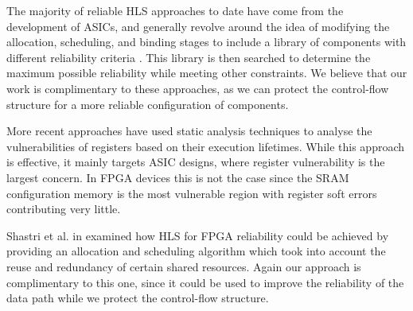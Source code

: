 The majority of reliable HLS approaches to date have come from the development
of ASICs, and generally revolve around the idea of modifying the
allocation, scheduling, and binding stages to include a library of
components with different reliability criteria \cite{tosun2005reliability}\cite{glass2007interactive}\cite{hara2013cost}.
This library is then searched to determine the maximum possible reliability while
meeting other constraints. We believe that our work is complimentary to these approaches,
as we can protect the control-flow structure for a more reliable configuration of components.

More recent approaches have used static analysis techniques to analyse the
vulnerabilities of registers based on their execution lifetimes\cite{chen2014reliability}.
While this approach is effective, it mainly targets ASIC designs, where register
vulnerability is the largest concern. In FPGA devices this is not the case since the
SRAM configuration memory is the most vulnerable region with register soft errors
contributing very little.

Shastri et al. in \cite{shastri2015scheduling} examined how HLS for FPGA reliability could
be achieved by providing an allocation and scheduling algorithm which took into account the
reuse and redundancy of certain shared resources.
Again our approach is complimentary to this one, since it could be used to
improve the reliability of the data path while we protect the control-flow structure.


